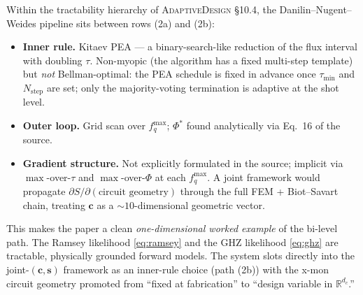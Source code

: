 \documentclass[11pt,a4paper]{article}
\newcommand{\R}{\mathbb{R}}
\begin{document}
Within the tractability hierarchy of \textsc{AdaptiveDesign} \S10.4, the Danilin--Nugent--Weides pipeline sits between rows (2a) and (2b):
\begin{itemize}[nosep,leftmargin=2em]
  \item \textbf{Inner rule.}  Kitaev PEA --- a binary-search-like reduction of the flux interval with doubling $\tau$.  Non-myopic (the algorithm has a fixed multi-step template) but \emph{not} Bellman-optimal: the PEA schedule is fixed in advance once $\tau_{\min}$ and $N_{\mathrm{step}}$ are set; only the majority-voting termination is adaptive at the shot level.
  \item \textbf{Outer loop.}  Grid scan over $f_q^{\max}$; $\Phi^*$ found analytically via Eq.~16 of the source.
  \item \textbf{Gradient structure.}  Not explicitly formulated in the source; implicit via $\max$-over-$\tau$ and $\max$-over-$\Phi$ at each $f_q^{\max}$.  A joint framework would propagate $\partial S/\partial(\text{circuit geometry})$ through the full FEM + Biot--Savart chain, treating $\bm{c}$ as a $\sim\!10$-dimensional geometric vector.
\end{itemize}

This makes the paper a clean \emph{one-dimensional worked example} of the bi-level path.  The Ramsey likelihood \eqref{eq:ramsey} and the GHZ likelihood \eqref{eq:ghz} are tractable, physically grounded forward models.  The system slots directly into the joint-$(\bm{c},\bm{s})$ framework as an inner-rule choice (path (2b)) with the x-mon circuit geometry promoted from ``fixed at fabrication'' to ``design variable in $\R^{d_c}$.''
\end{document}
